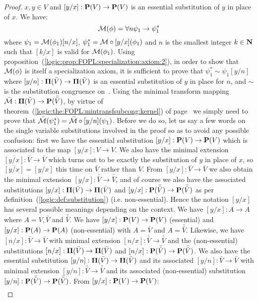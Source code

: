 \begin{proof}
$x,y\in V$ and $[y/x]:\mbox{${\bf P}(V)$}\to\mbox{${\bf P}(V)$}$ is an essential substitution of $y$
in place of $x$. We have:
    \[
    {\cal M}(\phi)=\forall n\psi_{1}\to\psi_{1}^{*}
    \]
where $\psi_{1}={\cal M}(\phi_{1})[n/x]$, $\psi_{1}^{*}={\cal
M}\circ[y/x](\phi_{1})$ and $n$ is the smallest integer $k\in\mbox{$\bf N$}$
such that $[k/x]$ is valid for ${\cal M}(\phi_{1})$. Using
proposition~(\ref{logic:prop:FOPL:specialization:axiom:2}), in order
to show that ${\cal M}(\phi)$ is itself a specialization axiom, it
is sufficient to prove that $\psi_{1}^{*}\sim\psi_{1}[y/n]$ where
$[y/n]:\mbox{${\bf\Pi}(\bar{V})$}\to\mbox{${\bf\Pi}(\bar{V})$}$ is an essential substitution of $y$ in place for
$n$, and $\sim$ is the substitution congruence on~\pvb. Using the
minimal transform mapping $\bar{\cal M}:\mbox{${\bf\Pi}(\bar{V})$}\to{\bf
P}(\bar{\bar{V}})$, by virtue of
theorem~(\ref{logic:the:FOPL:mintransfsubcong:kernel}) of
page~\pageref{logic:the:FOPL:mintransfsubcong:kernel} we simply need
to prove that $\bar{\cal M}(\psi_{1}^{*})=\bar{\cal
M}\circ[y/n](\psi_{1})$. Before we do so, let us say a few words on
the single variable substitutions involved in the proof so as to
avoid any possible confusion: first we have the essential
substitution $[y/x]:\mbox{${\bf P}(V)$}\to\mbox{${\bf P}(V)$}$ which is associated to the map
$[y/x]:V\to V$. We also have the minimal extension
$\overline{[y/x]}:\bar{V}\to\bar{V}$ which turns out to be exactly
the substitution of $y$ in place of $x$, so $\overline{[y/x]}=[y/x]$
this time on $\bar{V}$ rather than $V$. From
$[y/x]:\bar{V}\to\bar{V}$ we also obtain the minimal extension
$[y/x]:\bar{\bar{V}}\to\bar{\bar{V}}$, and of course we also have
the associated substitutions $[y/x]:\mbox{${\bf\Pi}(\bar{V})$}\to\mbox{${\bf\Pi}(\bar{V})$}$ and $[y/x]:{\bf
P}(\bar{\bar{V}})\to{\bf P}(\bar{\bar{V}})$ as per
definition~(\ref{logic:def:substitution}) (i.e. non-essential).
Hence the notation $[y/x]$ has several possible meanings depending
on the context. We have $[y/x]:A\to A$ where $A=V,\bar{V}$ and
$\bar{\bar{V}}$. We have $[y/x]:\mbox{${\bf P}(V)$}\to\mbox{${\bf P}(V)$}$ (essential) and
$[y/x]:{\bf P}(A)\to{\bf P}(A)$ (non-essential) with $A=\bar{V}$ and
$A=\bar{\bar{V}}$. Likewise, we have $[n/x]:\bar{V}\to\bar{V}$ with
minimal extension $[n/x]:\bar{\bar{V}}\to\bar{\bar{V}}$ and the
(non-essential) substitutions $[n/x]:\mbox{${\bf\Pi}(\bar{V})$}\to\mbox{${\bf\Pi}(\bar{V})$}$ and $[n/x]:{\bf
P}(\bar{\bar{V}})\to{\bf P}(\bar{\bar{V}})$. We also have the
essential substitution $[y/n]:\mbox{${\bf\Pi}(\bar{V})$}\to\mbox{${\bf\Pi}(\bar{V})$}$ and its associated
$[y/n]:\bar{V}\to\bar{V}$ with minimal extension
$[y/n]:\bar{\bar{V}}\to\bar{\bar{V}}$ and its associated
(non-essential) substitution $[y/n]:{\bf P}(\bar{\bar{V}})\to{\bf
P}(\bar{\bar{V}})$. From $[y/x]:\mbox{${\bf P}(V)$}\to\mbox{${\bf P}(V)$}$:
    \begin{eqnarray*}

\end{eqnarray*}
\end{proof}
